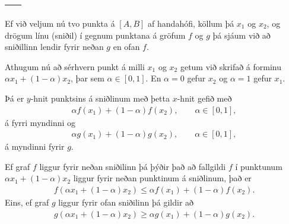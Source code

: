 \documentclass[b5paper,10pt,icelandic]{sphinxmanual}
\begin{document}
\begin{savenotes}\sphinxattablestart
\centering
\begin{tabulary}{\linewidth}[t]{|T|T|}
\hline
{}\label{\detokenize{kafli05:figa2}}
&\label{\detokenize{kafli05:figb2}}
\\
\hline
\end{tabulary}
\par
\sphinxattableend\end{savenotes}

Ef við veljum nú tvo punkta á \([A,B]\) af handahófi, köllum þá
\(x_1\) og \(x_2\), og drögum línu (sniðil) í gegnum punktana á
gröfum \(f\) og \(g\) þá sjáum við að sniðillinn lendir fyrir
neðan \(g\) en ofan \(f\).

Athugum nú að sérhvern punkt á milli \(x_1\) og \(x_2\) getum við skrifað á
forminu
\(\alpha x_1 + (1-\alpha)x_2\), þar sem \(\alpha \in [0,1]\). En \(\alpha=0\)
gefur \(x_2\) og \(\alpha=1\) gefur \(x_1\).

Þá er
\(y\)-hnit punktsins á sniðlinum með þetta \(x\)-hnit gefið með
\begin{equation*}
\begin{split}\alpha f(x_1) + (1-\alpha) f(x_2), \qquad \alpha \in [0,1],\end{split}
\end{equation*}
á fyrri myndinni og
\begin{equation*}
\begin{split}\alpha g(x_1) + (1-\alpha) g(x_2), \qquad \alpha \in [0,1],\end{split}
\end{equation*}
á myndinni fyrir \(g\).

Ef graf \(f\) liggur fyrir neðan sniðilinn þá þýðir það að fallgildi
\(f\) í punktunum \(\alpha x_1 + (1-\alpha)x_2\) liggur fyrir
neðan punktinum á sniðlinum, það er
\begin{equation*}
\begin{split}f(\alpha x_1+(1-\alpha)x_2)\leq \alpha f(x_1)+(1-\alpha)f(x_2).\end{split}
\end{equation*}
Eins, ef graf \(g\) liggur fyrir ofan sniðilinn þá gildir að
\begin{equation*}
\begin{split}g(\alpha x_1+(1-\alpha)x_2)\geq \alpha g(x_1)+(1-\alpha)g(x_2).\end{split}
\end{equation*}
\end{document}
